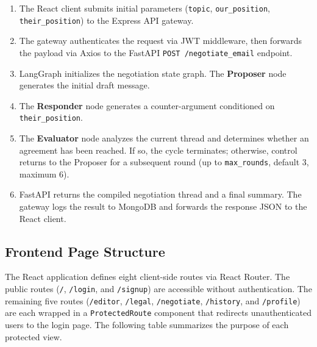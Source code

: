 \documentclass[12pt,a4paper]{report}
\begin{document}
\begin{enumerate}
	\item The React client submits initial parameters (\texttt{topic}, \texttt{our\_position}, \texttt{their\_position}) to the Express API gateway.
	\item The gateway authenticates the request via JWT middleware, then forwards the payload via Axios to the FastAPI \texttt{POST /negotiate\_email} endpoint.
	\item LangGraph initializes the negotiation state graph. The \textbf{Proposer} node generates the initial draft message.
	\item The \textbf{Responder} node generates a counter-argument conditioned on \texttt{their\_position}.
	\item The \textbf{Evaluator} node analyzes the current thread and determines whether an agreement has been reached. If so, the cycle terminates; otherwise, control returns to the Proposer for a subsequent round (up to \texttt{max\_rounds}, default 3, maximum 6).
	\item FastAPI returns the compiled negotiation thread and a final summary. The gateway logs the result to MongoDB and forwards the response JSON to the React client.
\end{enumerate}

\subsection{Frontend Page Structure}
The React application defines eight client-side routes via React Router. The public routes (\texttt{/}, \texttt{/login}, and \texttt{/signup}) are accessible without authentication. The remaining five routes (\texttt{/editor}, \texttt{/legal}, \texttt{/negotiate}, \texttt{/history}, and \texttt{/profile}) are each wrapped in a \texttt{ProtectedRoute} component that redirects unauthenticated users to the login page. The following table summarizes the purpose of each protected view.
\end{document}
